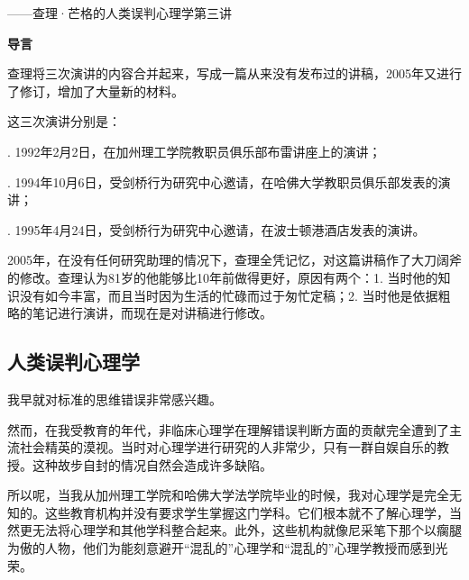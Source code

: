 \cleardoublepage
\renewcommand{\bookchapter}{3}

{\kaishu{}\centering ——查理·芒格的人类误判心理学第三讲\par}

\begin{LectureIntro}
\textbf{导言}
\par

{\kaishu 查理将三次演讲的内容合并起来，写成一篇从来没有发布过的讲稿，2005年又进行了修订，增加了大量新的材料。}
\par

{\kaishu 这三次演讲分别是：}
\par

{. 1992年2月2日，在加州理工学院教职员俱乐部布雷讲座上的演讲；}
\par

{. 1994年10月6日，受剑桥行为研究中心邀请，在哈佛大学教职员俱乐部发表的演讲；}
\par

{. 1995年4月24日，受剑桥行为研究中心邀请，在波士顿港酒店发表的演讲。}
\par

{\kaishu 2005年，在没有任何研究助理的情况下，查理全凭记忆，对这篇讲稿作了大刀阔斧的修改。查理认为81岁的他能够比10年前做得更好，原因有两个：1. 当时他的知识没有如今丰富，而且当时因为生活的忙碌而过于匆忙定稿；2. 当时他是依据粗略的笔记进行演讲，而现在是对讲稿进行修改。}
\par
\end{LectureIntro}

\clearpage
\subsection*{人类误判心理学}

我早就对标准的思维错误非常感兴趣。
\par

然而，在我受教育的年代，非临床心理学在理解错误判断方面的贡献完全遭到了主流社会精英的漠视。当时对心理学进行研究的人非常少，只有一群自娱自乐的教授。这种故步自封的情况自然会造成许多缺陷。
\par

所以呢，当我从加州理工学院和哈佛大学法学院毕业的时候，我对心理学是完全无知的。这些教育机构并没有要求学生掌握这门学科。它们根本就不了解心理学，当然更无法将心理学和其他学科整合起来。此外，这些机构就像尼采笔下那个以瘸腿为傲的人物，他们为能刻意避开“混乱的”心理学和“混乱的”心理学教授而感到光荣。
\par

